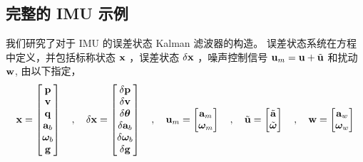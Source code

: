 \subsection{完整的 IMU 示例}

我们研究了对于 IMU 的误差状态 Kalman 滤波器的构造。 
误差状态系统在方程  中定义，并包括标称状态 ${\bf x}$ ，误差状态 $\delta{\bf x}$ ，噪声控制信号 ${\bf u}_m={\bf u}+\tilde{{\bf u}}$ 和扰动 ${\bf w}$, 由以下指定，
%
\begin{equation}
{\bf x} = \begin{bmatrix}
{\bf p} \\
{\bf v} \\
{\bf q} \\
{\bf a}_b \\
{\bm \omega}_b \\
{\bf g}
\end{bmatrix}
\quad , \quad
\delta{\bf x} = \begin{bmatrix}
\delta{\bf p} \\
\delta{\bf v} \\
\delta{\bm \theta} \\
\delta{\bf a}_b \\
\delta{\bm \omega}_b \\
\delta{\bf g}
\end{bmatrix}
\quad , \quad
{\bf u}_m=\begin{bmatrix}
{\bf a}_m \\ {\bm \omega}_m
\end{bmatrix} 
\quad , \quad
\tilde{{\bf u}}=\begin{bmatrix}
\tilde{{\bf a}} \\ \tilde{{\bm \omega}}
\end{bmatrix} 
\quad , \quad
{\bf w} = \begin{bmatrix}
{\bf a}_w \\ {\bm \omega}_w
\end{bmatrix}
\end{equation}

